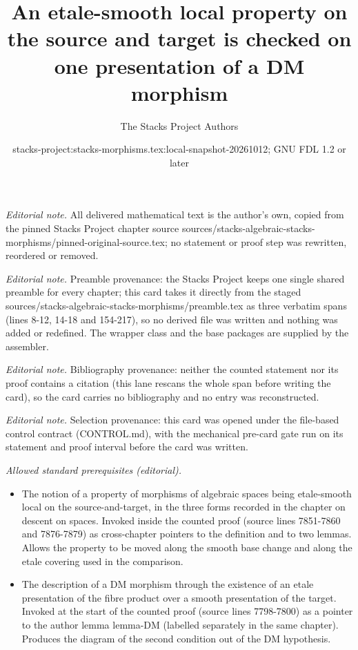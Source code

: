 \documentclass[10pt,a4paper]{amsart}
\title{An etale-smooth local property on the source and target is checked on one presentation of a DM morphism}
\author{The Stacks Project Authors}
\date{stacks-project:stacks-morphisms.tex:local-snapshot-20261012; GNU FDL 1.2 or later}
\theoremstyle{plain}
\theoremstyle{definition}
\theoremstyle{remark}
\numberwithin{equation}{subsection}
\begin{document}
\maketitle
\noindent\textit{Editorial note.} All delivered mathematical text is the author's own, copied from the pinned Stacks Project chapter source sources/stacks-algebraic-stacks-morphisms/pinned-original-source.tex; no statement or proof step was rewritten, reordered or removed.\par\medskip
\noindent\textit{Editorial note.} Preamble provenance: the Stacks Project keeps one single shared preamble for every chapter; this card takes it directly from the staged sources/stacks-algebraic-stacks-morphisms/preamble.tex as three verbatim spans (lines 8-12, 14-18 and 154-217), so no derived file was written and nothing was added or redefined. The wrapper class and the base packages are supplied by the assembler.\par\medskip
\noindent\textit{Editorial note.} Bibliography provenance: neither the counted statement nor its proof contains a citation (this lane rescans the whole span before writing the card), so the card carries no bibliography and no entry was reconstructed.\par\medskip
\noindent\textit{Editorial note.} Selection provenance: this card was opened under the file-based control contract (CONTROL.md), with the mechanical pre-card gate run on its statement and proof interval before the card was written.\par\medskip
\noindent\textit{Allowed standard prerequisites (editorial).}\begin{itemize}
\item The notion of a property of morphisms of algebraic spaces being etale-smooth local on the source-and-target, in the three forms recorded in the chapter on descent on spaces. Invoked inside the counted proof (source lines 7851-7860 and 7876-7879) as cross-chapter pointers to the definition and to two lemmas. Allows the property to be moved along the smooth base change and along the etale covering used in the comparison.
\item The description of a DM morphism through the existence of an etale presentation of the fibre product over a smooth presentation of the target. Invoked at the start of the counted proof (source lines 7798-7800) as a pointer to the author lemma lemma-DM (labelled separately in the same chapter). Produces the diagram of the second condition out of the DM hypothesis.
\end{itemize}\medskip
\end{document}

